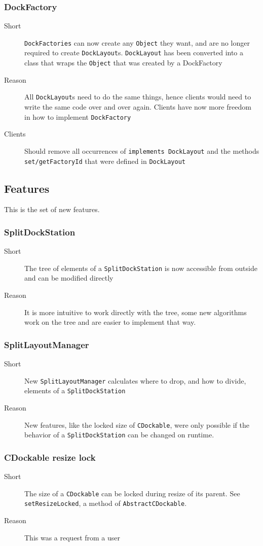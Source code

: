 \documentclass[a4paper,10pt]{article}
\newcommand{\src}[1]{\lstinline[basicstyle=\normalsize\ttfamily,keywordstyle=\normalsize\ttfamily,identifierstyle=\normalsize\ttfamily]|#1|}
\newcommand{\short}{\item[Short]}
\newcommand{\why}{\item[Reason]}
\newcommand{\clients}{\item[Clients]}
\begin{document}
\subsubsection{DockFactory}
\begin{description}
 \short \src{DockFactories} can now create any \src{Object} they want, and are no longer required to create \src{DockLayout}s. \src{DockLayout} has been converted into a class that wraps the \src{Object} that was created by a DockFactory
 \why All \src{DockLayout}s need to do the same things, hence clients would need to write the same code over and over again. Clients have now more freedom in how to implement \src{DockFactory}
 \clients Should remove all occurrences of \src{implements DockLayout} and the methods \src{set/getFactoryId} that were defined in \src{DockLayout}
\end{description}


\subsection{Features}
This is the set of new features.

\subsubsection{SplitDockStation}
\begin{description}
 \short The tree of elements of a \src{SplitDockStation} is now accessible from outside and can be modified directly
 \why It is more intuitive to work directly with the tree, some new algorithms work on the tree and are easier to implement that way.
\end{description}

\subsubsection{SplitLayoutManager}
\begin{description}
 \short New \src{SplitLayoutManager} calculates where to drop, and how to divide, elements of a \src{SplitDockStation}
 \why New features, like the locked size of \src{CDockable}, were only possible if the behavior of a \src{SplitDockStation} can be changed on runtime.
\end{description}

\subsubsection{CDockable resize lock}
\begin{description}
 \short The size of a \src{CDockable} can be locked during resize of its parent. See \src{setResizeLocked}, a method of \src{AbstractCDockable}.
 \why This was a request from a user
\end{description}
\end{document}
